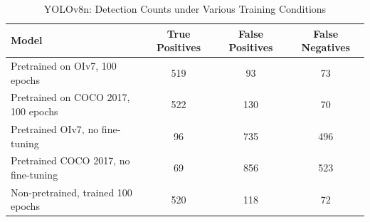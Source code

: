 \documentclass[10pt,twocolumn,letterpaper]{article}
\begin{document}
\begin{table}[H]
\centering
\caption{YOLOv8n: Detection Counts under Various Training Conditions}
\label{tab:detection_counts}
\begin{tabular}{|l|c|c|c|}
\hline
\textbf{Model} & \textbf{True Positives} & \textbf{False Positives} & \textbf{False Negatives} \\ \hline
Pretrained on OIv7, 100 epochs & 519 & 93 & 73 \\ \hline
Pretrained on COCO 2017, 100 epochs & 522 & 130 & 70 \\ \hline
Pretrained OIv7, no fine-tuning & 96 & 735 & 496 \\ \hline
Pretrained COCO 2017, no fine-tuning & 69 & 856 & 523 \\ \hline
Non-pretrained, trained 100 epochs & 520 & 118 & 72 \\ \hline
\end{tabular}
\end{table}
\end{document}
